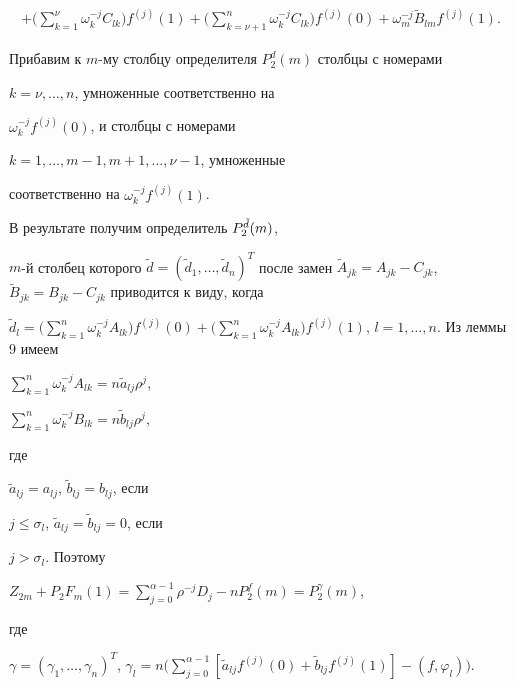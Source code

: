 \begin{pf}
\begin{multline*}
+\bigg(\sum\limits_{k=1}^{\nu}\omega_k^{-j}C_{lk}\bigg)f^{(j)}(1)+


\bigg(\sum\limits_{k=\nu+1}^n\omega_k^{-j}C_{lk}\bigg)f^{(j)}(0)


+\omega_m^{-j}\widetilde B_{lm}f^{(j)}(1).


\end{multline*}





Прибавим к $m$-му столбцу определителя $P_2^d(m)$ столбцы с номерами


$k=\nu,\dotsc,n$, умноженные соответственно на


$\omega_k^{-j}f^{(j)}(0)$, и столбцы с номерами


$k=1,\dotsc,m-1,m+1,\dotsc,\nu-1$, умноженные


соответственно на $\omega_k^{-j}f^{(j)}(1)$.


В результате получим определитель $P_2^{\Tilde d}(m)$,


$m$-й столбец которого $\widetilde d=(\widetilde


d_1,\dotsc,\widetilde d_n)^T$ после замен $\widetilde A_{jk}=A_{jk}-


C_{jk}$, $\widetilde B_{jk}=B_{jk}-C_{jk}$ приводится к виду, когда


$\widetilde d_l=\Big(\sum\limits_{k=1}^n\omega_k^{-j}A_{lk}\Big)


f^{(j)}(0)+\Big(\sum\limits_{k=1}^n\omega_k^{-j}A_{lk}


\Big)f^{(j)}(1)$, $l=1,\dotsc,n$. Из леммы 9 имеем


$\sum\limits_{k=1}^n\omega_k^{-j}A_{lk}=n\widetilde a_{lj}\rho^j$,


$\sum\limits_{k=1}^n\omega_k^{-j}B_{lk}=n\widetilde b_{lj}\rho^j$,


где


$\widetilde a_{lj}=a_{lj}$, $\widetilde b_{lj}=b_{lj}$, если


$j\le\sigma_l$, $\widetilde a_{lj}=\widetilde b_{lj}=0$, если


$j>\sigma_l$. Поэтому


$Z_{2m}+P_2F_m(1)=\sum\limits_{j=0}^{\alpha-1}\rho^{-j}


D_j-nP_2^f(m)=P_2^\gamma(m)$,


где


$\gamma=(\gamma_1,\dotsc,\gamma_n)^T$, $\gamma_l=n


\Big(\sum\limits_{j=0}^{\alpha-1}[\widetilde a_{lj}f^{(j)}


(0)+\widetilde b_{lj}f^{(j)}(1)]-(f,\varphi_l)\Big)$.



\end{pf}
